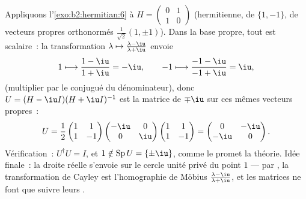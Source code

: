 \begin{example}\label{ex:b2:hermitian:cayleyrun}
Appliquons l'\cref{exo:b2:hermitian:6} à $H = \begin{pmatrix} 0 & 1\\
1 & 0\end{pmatrix}$ (hermitienne, de  $\{1, -1\}$,
de vecteurs propres orthonormés $\frac{1}{\sqrt2}(1, \pm1)$). Dans la
base propre, tout est scalaire~: la transformation $\lambda
\mapsto \frac{\lambda - \iu}{\lambda + \iu}$ envoie
\[
1 \longmapsto \frac{1 - \iu}{1 + \iu} = -\iu,
\qquad
-1 \longmapsto \frac{-1 - \iu}{-1 + \iu} = \iu ,
\]
(multiplier par le conjugué du dénominateur), donc $U = (H -
\iu I)(H + \iu I)^{-1}$ est la matrice  de 
$\mp\iu$ sur ces mêmes vecteurs propres~:
\[
U = \frac{1}{2}\begin{pmatrix} 1 & 1\\ 1 & -1\end{pmatrix}
\begin{pmatrix} -\iu & 0\\ 0 & \iu\end{pmatrix}
\begin{pmatrix} 1 & 1\\ 1 & -1\end{pmatrix}
= \begin{pmatrix} 0 & -\iu\\ -\iu & 0\end{pmatrix} .
\]
Vérification~: $U^\dagger U = I$, et $1 \notin \operatorname{Sp}U =
\{\pm\iu\}$, comme le promet la théorie. Idée finale~: la droite
réelle s'envoie sur le cercle unité privé du point $1$ ---
 par , la transformation de Cayley est
l'homographie de Möbius $\frac{\lambda-\iu}{\lambda+\iu}$, et les
matrices ne font que suivre leurs .
\end{example}

